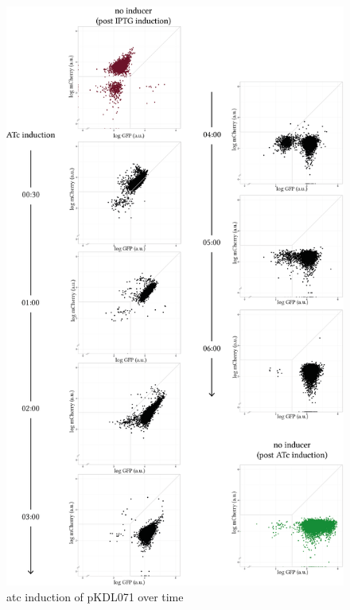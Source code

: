 \begin{figure}[tb]
	\begin{center}
\includegraphics[scale=0.7]{../../chapters/chapterABCFlow/images/pKDL071_atc_time.png}
\caption[\acrshort{atc} induction of pKDL071 over time]{\label{fig:switch_timecourse_atc} \acrshort{atc} induction of pKDL071 over time}
\end{center}
\end{figure}


